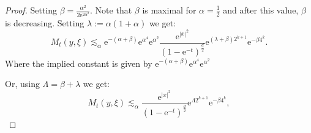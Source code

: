 \documentclass[a4paper,oneside,10pt]{amsproc}
\theoremstyle{plain}
\theoremstyle{remark}
\newcommand{\e}{\mathrm{e}} %
\begin{document}
\begin{proof}
Setting $\beta = \frac{\alpha^2}{2 \e^{2\alpha^2}}$. Note that $\beta$
is maximal for $\alpha = \frac12$ and after this value, $\beta$ is decreasing.
  Setting $\lambda := \alpha(1 + \alpha)$ we get:
  \begin{equation}
    \label{eq:Mehler-kernel-estimate-one-sided-bound-2}
    M_t(y, \xi) \lesssim_\alpha  \e^{-(\alpha + \beta)} \e^{\alpha^4} \e^{\alpha^2} \frac{ \e^{|x|^2} }{(1 - \e^{-t})^{\frac{d}2}} \e^{(\lambda + \beta) 2^{k + 1}} \e^{-\beta 4^k}.
  \end{equation}
  Where the implied constant is given by $\e^{-(\alpha + \beta)} \e^{\alpha^4} \e^{\alpha^2}$

  Or, using $\Lambda = \beta + \lambda$ we get:
  \begin{equation}
    \label{eq:Mehler-kernel-estimate-one-sided-bound-2}
    M_t(y, \xi) \lesssim_\alpha \frac{\e^{|x|^2}}{(1
      - \e^{-t})^{\frac{d}2}} \e^{\Lambda 2^{k + 1}}
    \e^{-\beta 4^k},
  \end{equation}


\end{proof}
\end{document}
